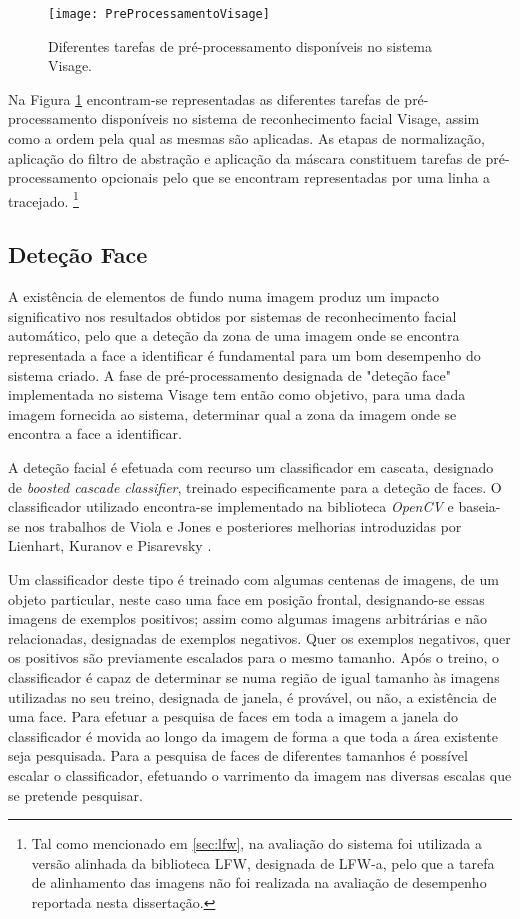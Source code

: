 \begin{figure}[t]
  \begin{center}
    \leavevmode
    \texttt{[image: PreProcessamentoVisage]}
    \caption{Diferentes tarefas de pré-processamento disponíveis no sistema Visage.}
    \label{fig:preprocessamento}
  \end{center}
\end{figure}


Na Figura \ref{fig:preprocessamento} encontram-se representadas as diferentes tarefas de pré-processamento disponíveis no sistema de reconhecimento facial Visage, assim como a ordem pela qual as mesmas são aplicadas. As etapas de normalização, aplicação do filtro de abstração e aplicação da máscara constituem tarefas de pré-processamento opcionais pelo que se encontram representadas por uma linha a tracejado. \footnote{Tal como mencionado em \ref{sec:lfw}, na avaliação do sistema foi utilizada a versão alinhada da biblioteca LFW, designada de LFW-a, pelo que a tarefa de alinhamento das imagens não foi realizada na avaliação de desempenho reportada nesta dissertação.}

\subsection{Deteção Face} \label{sec:detecao_face}
A existência de elementos de fundo numa imagem produz um impacto significativo nos resultados obtidos por sistemas de reconhecimento facial automático, pelo que a deteção da zona de uma imagem onde se encontra representada a face a identificar é fundamental para um bom desempenho do sistema criado. A fase de pré-processamento designada de "deteção face" implementada no sistema Visage tem então como objetivo, para uma dada imagem fornecida ao sistema, determinar qual a zona da imagem onde se encontra a face a identificar.

A deteção facial é efetuada com recurso um classificador em cascata, designado de \textit{boosted cascade classifier},  treinado especificamente para a deteção de faces. O classificador utilizado encontra-se implementado na biblioteca \textit{OpenCV} e baseia-se nos trabalhos de Viola e Jones \cite{Viola2001} e posteriores melhorias introduzidas por Lienhart, Kuranov e Pisarevsky \cite{Lienhart2003}.

Um classificador deste tipo é treinado com algumas centenas de imagens, de um objeto particular, neste caso uma face em posição frontal, designando-se essas imagens de exemplos positivos; assim como algumas imagens arbitrárias e não relacionadas, designadas de exemplos negativos. Quer os exemplos negativos, quer os positivos são previamente escalados para o mesmo tamanho. Após o treino, o classificador é capaz de determinar se numa região de igual tamanho às imagens utilizadas no seu treino, designada de janela, é provável, ou não,  a existência de uma face. Para efetuar a pesquisa de faces em toda a imagem a janela do classificador é movida ao longo da imagem de forma a que toda a área existente seja pesquisada. Para a pesquisa de faces de diferentes tamanhos é possível escalar o classificador, efetuando o varrimento da imagem nas diversas escalas que se pretende pesquisar.

